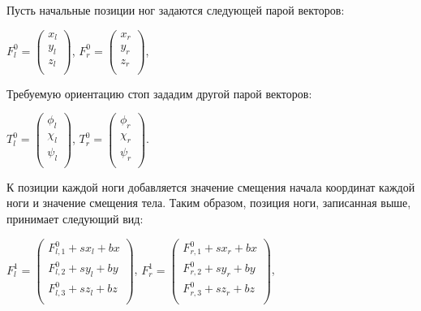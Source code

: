 Пусть начальные позиции ног задаются следующей парой векторов:

\begin{center}
$F^{0}_{l} = \begin{pmatrix}
x_l \\
y_l \\
z_l \\
\end{pmatrix}$,
$F^{0}_{r} = \begin{pmatrix}
x_r \\
y_r \\
z_r \\
\end{pmatrix}$,
\end{center}

Требуемую ориентацию стоп зададим другой парой векторов:

\begin{center}
$T^{0}_{l} = \begin{pmatrix}
\phi_l \\
\chi_l \\
\psi_l \\
\end{pmatrix}$,
$T^{0}_{r} = \begin{pmatrix}
\phi_r \\
\chi_r \\
\psi_r \\
\end{pmatrix}$.
\end{center}

К позиции каждой ноги добавляется значение смещения начала координат каждой ноги и значение смещения тела.  Таким образом, позиция ноги, записанная выше, принимает следующий вид:


\begin{center}
$F^{1}_{l} = \begin{pmatrix}
F^{0}_{l,1} + sx_l + bx \\
F^{0}_{l,2} + sy_l + by \\
F^{0}_{l,3} + sz_l + bz \\
\end{pmatrix}$, $F^{1}_{r} = \begin{pmatrix}
F^{0}_{r,1} + sx_r + bx \\
F^{0}_{r,2} + sy_r + by \\
F^{0}_{r,3} + sz_r + bz \\
\end{pmatrix}$,
\end{center}

